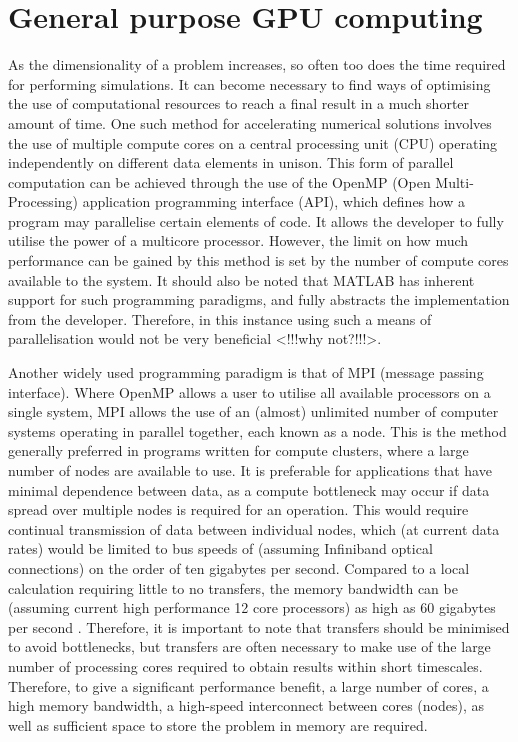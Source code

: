 \section{General purpose GPU computing}

As the dimensionality of a problem increases, so often too does the time required for performing simulations. It can become necessary to find ways of optimising the use of computational resources to reach a final result in a much shorter amount of time. One such method for accelerating numerical solutions involves the use of multiple compute cores on a central processing unit (CPU) operating independently on different data elements in unison. This form of parallel computation can be achieved through the use of the OpenMP (Open Multi-Processing) application programming interface (API), which defines how a program may parallelise certain elements of code. It allows the developer to fully utilise the power of a multicore processor. However, the limit on how much performance can be gained by this method is set by the number of compute cores available to the system. It should also be noted that MATLAB has inherent support for such programming paradigms, and fully abstracts the implementation from the developer. Therefore, in this instance using such a means of parallelisation would not be very beneficial <!!!why not?!!!>.

Another widely used programming paradigm is that of MPI (message passing interface). Where OpenMP allows a user to utilise all available processors on a single system, MPI allows the use of an (almost) unlimited number of computer systems operating in parallel together, each known as a node. This is the method generally preferred in programs written for compute clusters, where a large number of nodes are available to use. It is preferable for applications that have minimal dependence between data, as a compute bottleneck may occur if data spread over multiple nodes is required for an operation. This would require continual transmission of data between individual nodes, which (at current data rates) would be limited to bus speeds of (assuming Infiniband optical connections) on the order of ten gigabytes per second. Compared to a local calculation requiring little to no transfers, the memory bandwidth can be (assuming current high performance 12 core processors) as high as 60 gigabytes per second \cite{DAT:Intel_xeon}. Therefore, it is important to note that transfers should be minimised to avoid bottlenecks, but transfers are often necessary to make use of the large number of processing cores required to obtain results within short timescales. Therefore, to give a significant performance benefit, a large number of cores, a high memory bandwidth, a high-speed interconnect between cores (nodes), as well as sufficient space to store the problem in memory are required.

